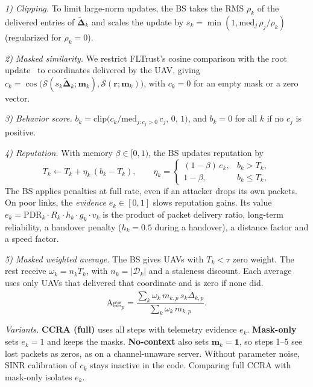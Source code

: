 \documentclass[journal]{IEEEtran}
\begin{document}
\emph{1) Clipping.} To limit large-norm updates, the BS takes the RMS $\rho_k$ of
the delivered entries of $\tilde{\boldsymbol\Delta}_k$ and scales the update by
$s_k=\min(1,\mathrm{med}_j\,\rho_j/\rho_k)$ (regularized for $\rho_k=0$).

\emph{2) Masked similarity.} We restrict FLTrust's cosine comparison with the root
update~\cite{cao2021fltrust} to coordinates delivered by the UAV, giving
$c_k=\cos\bigl(\mathcal{S}(s_k\tilde{\boldsymbol\Delta}_k;\mathbf{m}_k),\mathcal{S}(\mathbf{r};\mathbf{m}_k)\bigr)$,
with $c_k=0$ for an empty mask or a zero vector.

\emph{3) Behavior score.} $b_k=\mathrm{clip}\bigl(c_k/\mathrm{med}_{j:c_j>0}\,c_j,\,0,\,1\bigr)$,
and $b_k=0$ for all $k$ if no $c_j$ is positive.

\emph{4) Reputation.} With memory $\beta\in[0,1)$, the BS updates reputation by
\begin{equation}
  T_k \leftarrow T_k + \eta_k\,(b_k-T_k),\qquad
  \eta_k=\begin{cases}(1-\beta)\,e_k, & b_k>T_k,\\ 1-\beta, & b_k\le T_k,\end{cases}
  \label{eq:rep}
\end{equation}
The BS applies penalties at full rate, even if an attacker drops its own
packets. On poor links, the \emph{evidence} $e_k\in[0,1]$ slows reputation gains.
Its value $e_k=\mathrm{PDR}_k\cdot R_k\cdot h_k\cdot g_k\cdot v_k$ is the product of
packet delivery ratio, long-term reliability, a handover penalty ($h_k=0.5$ during a
handover), a distance factor and a speed factor.

\emph{5) Masked weighted average.} The BS gives UAVs with $T_k<\tau$ zero weight.
The rest receive $\omega_k=n_kT_k$, with $n_k=|\mathcal{D}_k|$ and a staleness
discount. Each average uses only UAVs that delivered that coordinate and is zero
if none did.
\begin{equation}
  \mathrm{Agg}_p=\frac{\sum_k \omega_k\, m_{k,p}\, s_k\tilde\Delta_{k,p}}{\sum_k \omega_k\, m_{k,p}}.
\end{equation}

\emph{Variants.} \textbf{CCRA (full)} uses all steps with telemetry evidence $e_k$.
\textbf{Mask-only} sets $e_k=1$ and keeps the masks. \textbf{No-context} also sets
$\mathbf{m}_k=\mathbf{1}$, so steps 1--5 see lost packets as zeros, as on a
channel-unaware server. Without parameter noise, SINR calibration of $c_k$ stays
inactive in the code. Comparing full CCRA with mask-only isolates $e_k$.
\end{document}

